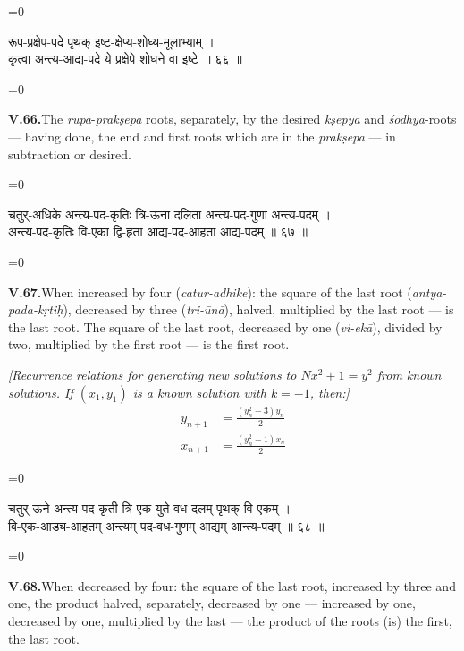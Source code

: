 \documentclass[11pt,a4paper]{article}
\newcommand{\dev}[1]{{\devanagarifont\color{sktcolor}#1}}
\newcommand{\iast}[1]{\textit{#1}}
\newenvironment{paracol}[1]{\begingroup}{\endgroup}
\newcommand{\switchcolumn}[1][]{%
  \ifnum#1=0\relax\else\par\nobreak\vspace{0.5em}\par\nobreak\fi%
}
\begin{document}
\vspace{0.3cm}

\begin{paracol}{2}
\switchcolumn[0]
\dev{%
रूप-प्रक्षेप-पदे पृथक् इष्ट-क्षेप्य-शोध्य-मूलाभ्याम् ।\\
कृत्वा अन्त्य-आद्य-पदे ये प्रक्षेपे शोधने वा इष्टे ॥ ६६ ॥
}

\switchcolumn[1]
\textbf{V.66.}\quad The \iast{rūpa}-\iast{prakṣepa} roots,
separately, by the desired \iast{kṣepya} and
\iast{śodhya}-roots — having done, the end and first roots which
are in the \iast{prakṣepa} — in subtraction or desired.
\end{paracol}

\vspace{0.3cm}

\begin{paracol}{2}
\switchcolumn[0]
\dev{%
चतुर्-अधिके अन्त्य-पद-कृतिः त्रि-ऊना दलिता अन्त्य-पद-गुणा अन्त्य-पदम् ।\\
अन्त्य-पद-कृतिः वि-एका द्वि-हृता आद्य-पद-आहता आद्य-पदम् ॥ ६७ ॥
}

\switchcolumn[1]
\textbf{V.67.}\quad When increased by four (\iast{catur-adhike}):
the square of the last root (\iast{antya-pada-kṛtiḥ}), decreased by
three (\iast{tri-ūnā}), halved, multiplied by the last root — is
the last root. The square of the last root, decreased by one
(\iast{vi-ekā}), divided by two, multiplied by the first root —
is the first root.

\medskip
\textit{[Recurrence relations for generating new solutions to
$Nx^2 + 1 = y^2$ from known solutions. If $(x_1, y_1)$ is a known
solution with $k = -1$, then:]}
\begin{align*}
y_{n+1} &= \frac{(y_n^2 - 3)y_n}{2} \\
x_{n+1} &= \frac{(y_n^2 - 1)x_n}{2}
\end{align*}
\end{paracol}

\vspace{0.3cm}

\begin{paracol}{2}
\switchcolumn[0]
\dev{%
चतुर्-ऊने अन्त्य-पद-कृती त्रि-एक-युते वध-दलम् पृथक् वि-एकम् ।\\
वि-एक-आड्य-आहतम् अन्त्यम् पद-वध-गुणम् आद्यम् आन्त्य-पदम् ॥ ६८ ॥
}

\switchcolumn[1]
\textbf{V.68.}\quad When decreased by four: the square of the last
root, increased by three and one, the product halved, separately,
decreased by one — increased by one, decreased by one, multiplied
by the last — the product of the roots (is) the first, the last
root.
\end{paracol}
\end{document}

